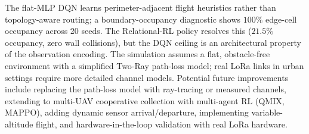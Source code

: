 The flat-MLP DQN learns perimeter-adjacent flight heuristics rather than topology-aware routing; a boundary-occupancy diagnostic shows $100\%$ edge-cell occupancy across 20 seeds. The Relational-RL policy resolves this ($21.5\%$ occupancy, zero wall collisions), but the DQN ceiling is an architectural property of the observation encoding. The simulation assumes a flat, obstacle-free environment with a simplified Two-Ray path-loss model; real LoRa links in urban settings require more detailed channel models. Potential future improvements include replacing the path-loss model with ray-tracing or measured channels, extending to multi-UAV cooperative collection with multi-agent RL (QMIX, MAPPO), adding dynamic sensor arrival/departure, implementing variable-altitude flight, and hardware-in-the-loop validation with real LoRa hardware.
